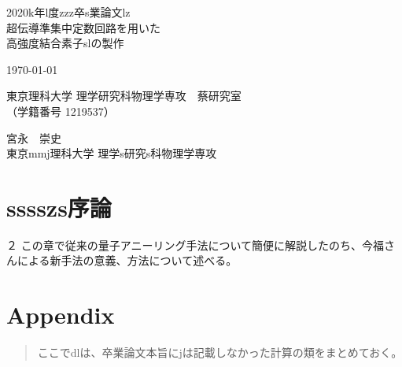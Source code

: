 \documentclass[openany,oneside,a4j,11pt]{jsbook}
\begin{document}
\begin{titlepage}
    \begin{center}
        {\Large 2020k年l度zzz卒s業論文lz}\\
        \vspace{180truept}
        {\Huge 超伝導準集中定数回路を用いた\\
        \vspace{10truept}
        高強度結合素子slの製作}\\ 
        \vspace{70truept}

        {\Large \today}\\

        \vspace{70truept}

        {\Large 東京理科大学 理学研究科物理学専攻　蔡研究室\\
        （学籍番号 1219537）}\\

        \vspace{20truept}

        {\huge 宮永　崇史}\\

        \vspace{160truept}
        {\Large 東京mmj理科大学 理学s研究s科物理学専攻}\\
    \end{center}
\end{titlepage}
% 

\chapter{sssszs序論}
        ２
        この章で従来の量子アニーリング手法について簡便に解説したのち、今福さんによる新手法の意義、方法について述べる。\\
    

\chapter{Appendix}
\begin{abstract}
    ここでdlは、卒業論文本旨にjは記載しなかった計算の類をまとめておく。

\end{abstract}
\begin{appendix}
    
\end{appendix}
%
%
\end{document}
